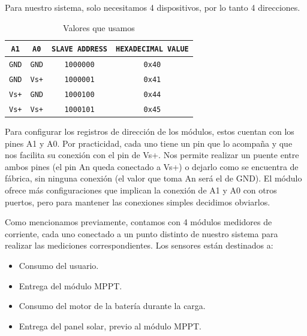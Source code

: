                     Para nuestro sistema, solo necesitamos 4 dispositivos, por lo tanto 4 direcciones.\par
                    \begin{table}[H]
                        \centering
                        \begin{tabular}{|c|c|c|c|}
                        \hline
                            \texttt{A1} & \texttt{A0} & \texttt{SLAVE ADDRESS} & \texttt{HEXADECIMAL VALUE}\\
                        \hline
                             \texttt{GND} & \texttt{GND} & \texttt{1000000} & \texttt{0x40}\\
                        \hline
                            \texttt{GND} & \texttt{Vs+} & \texttt{1000001} & \texttt{0x41}\\
                        \hline
                            \texttt{Vs+} & \texttt{GND} & \texttt{1000100} & \texttt{0x44}\\
                        \hline
                            \texttt{Vs+} & \texttt{Vs+} & \texttt{1000101} & \texttt{0x45}\\
                        \hline
                        \end{tabular}
                        \caption{Valores que usamos}
                        \label{tab:s5}
                    \end{table}
                    
                    Para configurar los registros de dirección de los módulos, estos cuentan con los pines A1 y A0. Por practicidad, cada uno tiene un pin que lo acompaña y que nos facilita su conexión con el pin de Vs+. Nos permite realizar un puente entre ambos pines (el pin An queda conectado a Vs+) o dejarlo como se encuentra de fábrica, sin ninguna conexión (el valor que toma An será el de GND). El módulo ofrece más configuraciones que implican la conexión de A1 y A0 con otros puertos, pero para mantener las conexiones simples decidimos obviarlos.\par
                    
                    Como mencionamos previamente, contamos con 4 módulos medidores de corriente, cada uno conectado a un punto distinto de nuestro sistema para realizar las mediciones correspondientes. Los sensores están destinados a:\par

                \begin{itemize} [label=•]
                    \setlength{\itemindent}{1.5em}
                    
                    \item Consumo del usuario.
                    \item Entrega del módulo MPPT.
                    \item Consumo del motor de la batería durante la carga.
                    \item Entrega del panel solar, previo al módulo MPPT.
                \end{itemize}
                
